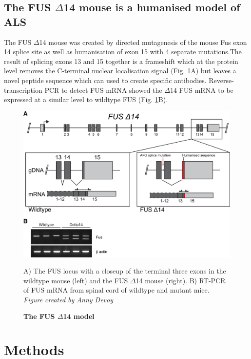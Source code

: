\subsection{The FUS $\Delta$14 mouse is a humanised model of ALS}
The FUS $\Delta$14 mouse was created by directed mutagenesis of the mouse Fus exon 14 splice site as well as humanisation of exon 15 with 4 separate mutations.The result of splicing exons 13 and 15 together is a frameshift which at the protein level removes the C-terminal nuclear localisation signal (Fig. \ref{fig:delta14_structure}A) but leaves a novel peptide sequence which can used to create specific antibodies. Reverse-transcription PCR to detect FUS mRNA showed the $\Delta$14 FUS mRNA to be expressed at a similar level to wildtype FUS (Fig. \ref{fig:delta14_structure}B). 


\begin{figure}[h!]
	\begin{center}
		\includegraphics[width=\textwidth]{Figures/04_fus_mice/anny_FUS_schematic.png}
	\end{center}
	\caption{\textbf{The FUS $\Delta$14 model} }
		A) The FUS locus with a closeup of the terminal three exons in the wildtype mouse (left) and the FUS $\Delta$14 mouse (right). 
		B) RT-PCR of FUS mRNA from spinal cord of wildtype and mutant mice. \textit{Figure created by Anny Devoy}
		\label{fig:delta14_structure}
\end{figure}


\section{Methods}

